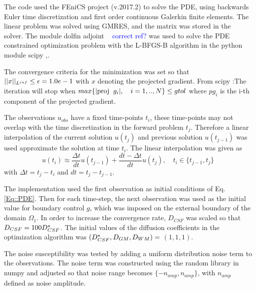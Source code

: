 \documentclass[11pt,a4paper]{article}
\newcommand{\kam}[1]{\textcolor{blue}{#1}}
\begin{document}

The code used the FEniCS project (v.2017.2)  to solve the PDE, using backwards Euler time discretization and first order continuous Galerkin finite elements. The linear problem was solved using GMRES, and the matrix was stored in the solver. 
The module dolfin adjoint ~\cite{farrell2013automated} \kam{correct ref?}  was used to solve the PDE constrained optimization problem with the L-BFGS-B algorithm in the python module scipy \cite{LBFGSB1},\cite{LBFGSB2}. 



The convergence criteria for the minimization was set so that $|| x ||_{L\sp{inf}} \leq \epsilon=1.0e-1$ with $x$ denoting the projected gradient. {\color{red} From scipy :The iteration will stop when $max\lbrace | \text{proj} \hspace*{0.2cm} g_i | , \quad i = 1, .., N \rbrace \leq gtol $  where $pg_i$ is the i-th component of the projected gradient.}

The observations $u_{obs}$ have a fixed time-points $t_i$, these time-points may not overlap with the time discretization in the forward problem $t_j$. Therefore a linear interpolation of the current solution $u(t_j)$ and previous solution $u(t_{j-1})$ was used approximate the solution at time $t_i$. The linear interpolation was given as  
\begin{equation}
\label{observation:interpolation}
u(t_i) \approx \frac{\Delta t}{dt} u(t_{j-1}) + \frac{dt - \Delta t }{dt} u(t_{j}), \quad t_i \in \lbrace t_{j-1}, t_j \rbrace
\end{equation}
with $\Delta t = t_j-t_i$ and $dt  = t_{j} - t_{j-1}$.


The implementation used the first observation as initial conditions of Eq.\ref{Eq::PDE}. Then for each time-step, the next observation was used as the initial value for boundary control $g$, which was imposed on the external boundary of the domain $\Omega_1$. In order to increase the convergence rate, $D_{CSF}$ was scaled so that $D_{CSF} = 100 D_{CSF}\sp{\star} $. The initial values of the diffusion coefficients in the optimization algorithm was $(D_{CSF}\sp{\star}, D_{GM}, D_{WM})=$  $(1, 1, 1)$. 

The noise susceptibility was tested by adding a uniform distribution noise term to the observations. The noise term was constructed using the random library in numpy and adjusted so that noise range becomes $\lbrace -n_{amp} , n_{amp} \rbrace $, with $n_{amp}$ defined as noise amplitude. 
\end{document}
